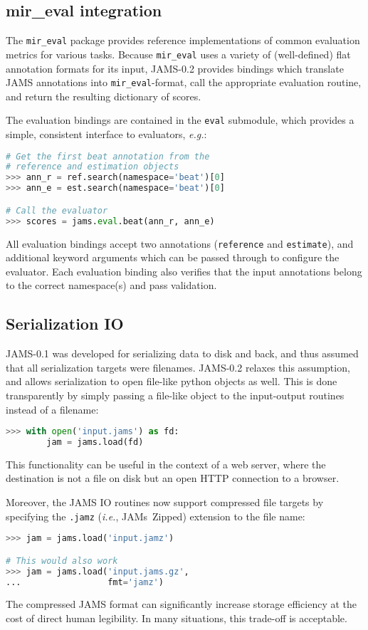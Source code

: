 \documentclass{article}
\begin{document}
\subsection{mir\_eval integration}\label{sec:imp:mireval}
The \texttt{mir\_eval} package provides reference implementations of common evaluation
metrics for various tasks.
Because \texttt{mir\_eval} uses a variety of (well-defined) flat annotation formats for
its input, JAMS-0.2 provides bindings which translate JAMS annotations into
\texttt{mir\_eval}-format, call the appropriate evaluation routine, and return the
resulting dictionary of scores.

The evaluation bindings are contained in the \texttt{eval} submodule, which provides
a simple, consistent interface to evaluators, \emph{e.g.}:
\begin{lstlisting}[language=python]
# Get the first beat annotation from the
# reference and estimation objects
>>> ann_r = ref.search(namespace='beat')[0]
>>> ann_e = est.search(namespace='beat')[0]

# Call the evaluator
>>> scores = jams.eval.beat(ann_r, ann_e)
\end{lstlisting}
All evaluation bindings accept two annotations (\texttt{ref\-erence} and \texttt{estimate}), 
and additional keyword arguments which can be passed through to configure the evaluator.
Each evaluation binding also verifies that the input annotations belong to the 
correct namespace(s) and pass validation.


\subsection{Serialization IO}\label{sec:imp:compression}

JAMS-0.1 was developed for serializing data to disk and back, and thus assumed that all
serialization targets were filenames.  JAMS-0.2 relaxes this assumption, and allows
serialization to open file-like python objects as well.  This is done transparently by
simply passing a file-like object to the input-output routines instead of a filename:
\begin{lstlisting}[language=python]
>>> with open('input.jams') as fd:
        jam = jams.load(fd)
\end{lstlisting}
This functionality can be useful in the context of a web server, where 
the destination is not a file on disk but an open HTTP connection to a browser.

Moreover, the JAMS IO routines now support compressed file targets by specifying the
\texttt{.jamz} (\emph{i.e.}, JAMs~Zipped) extension to the file name:
\begin{lstlisting}[language=python]
>>> jam = jams.load('input.jamz')

# This would also work
>>> jam = jams.load('input.jams.gz',
...                 fmt='jamz')
\end{lstlisting}
The compressed JAMS format can significantly increase storage efficiency at the cost of
direct human legibility.  In many situations, this trade-off is acceptable.
\end{document}
